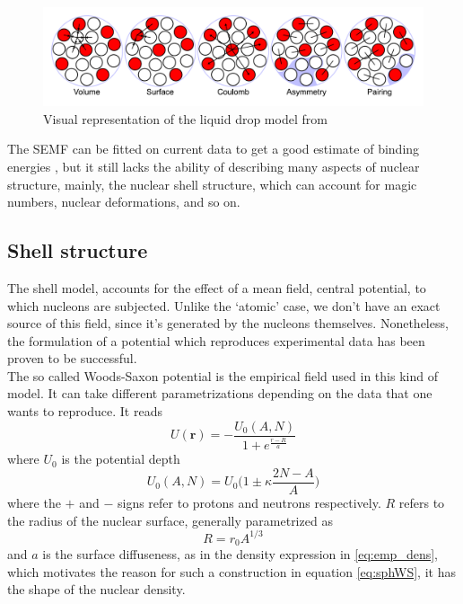 \begin{figure}[h]
    \centering
    \includegraphics[width=1.0\textwidth]{Images/Liquid_drop_model.pdf}
    \caption{Visual representation of the liquid drop model from \cite{ldmimg}}
    \label{fig:liquid_drop_model}
\end{figure}
The SEMF can be fitted on current data to get a good estimate of binding energies \cite{Benzaid2020}, but it still lacks the ability of describing many aspects of nuclear structure, mainly, the nuclear shell structure, which can account for magic numbers, nuclear deformations, and so on.
\subsection{Shell structure}
The shell model, accounts for the effect of a mean field, central potential, to which nucleons are subjected. Unlike the `atomic' case, we don't have an exact source of this field, since it's generated by the nucleons themselves. Nonetheless, the formulation of a potential which reproduces experimental data has been proven to be successful.
\\The so called Woods-Saxon potential is the empirical field used in this kind of model. It can take different parametrizations depending on the data that one wants to reproduce. It reads
\begin{equation}
    \label{eq:sphWS}
    U(\bm r) = -\frac{U_0(A, N)}{1+e^\frac{r - R}{a}}
\end{equation}
where $U_0$ is the potential depth
\begin{equation}
    U_0(A, N) = U_0\bigg(1\pm \kappa \frac{2N -A }A\bigg)
\end{equation}
where the $+$ and $-$ signs refer to protons and neutrons respectively. $R$ refers to the radius of the nuclear surface, generally parametrized as 
\begin{equation}
    R=r_0 A^{1/3}
\end{equation}
and $a$ is the surface diffuseness, as in the density expression in \eqref{eq:emp_dens}, which motivates the reason for such a construction in equation \eqref{eq:sphWS}, it has the shape of the nuclear density.
